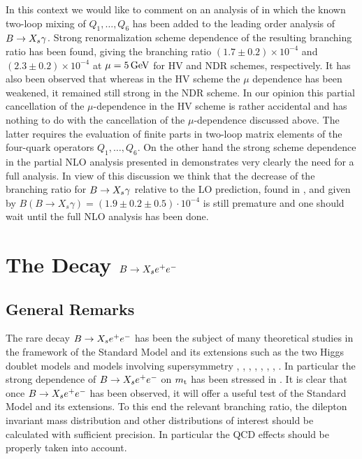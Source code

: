 In this context we would like to comment on an analysis of
\cite{Ciu:94} in which the known two-loop mixing of $Q_1,\ldots,Q_6$
has been added to the leading order analysis of $B \to X_s \gamma$.  Strong
renormalization scheme dependence of the resulting branching ratio has
been found, giving the branching ratio $(1.7 \pm 0.2)\times 10^{-4}$
and $(2.3 \pm 0.2)\times 10^{-4}$ at $\mu=5\, {\rm GeV}$ for HV and NDR
schemes, respectively. It has also been observed that whereas in the HV
scheme the $\mu$ dependence has been weakened, it remained still strong
in the NDR scheme. In our opinion this partial cancellation of the
$\mu$-dependence in the HV scheme is rather accidental and has nothing
to do with the cancellation of the $\mu$-dependence discussed above. The
latter requires the evaluation of finite parts in two-loop matrix
elements of the four-quark operators $Q_1,\ldots,Q_6$.  On the other
hand the strong scheme dependence in the partial NLO analysis presented
in \cite{Ciu:94} demonstrates very clearly the need for a full
analysis.  In view of this discussion we think that the decrease of the
branching ratio for $B \to X_s \gamma$ relative to the LO prediction, found in
\cite{Ciu:94}, and given by $B(B \to X_s \gamma) = (1.9 \pm 0.2 \pm
0.5) \cdot 10^{-4}$ is still premature and one should wait until the
full NLO analysis has been done.

\section{The Decay $B\to X_{\lowercase{s}} \lowercase{e}^+\lowercase{e}^-$}
         \label{sec:Heff:BXsee:nlo}
\subsection{General Remarks} 
         \label{sec:Heff:BXsee:nlo:rem}
The rare decay $B \to X_s e^+ e^-$ has been the subject of many theoretical studies
in the framework of the Standard Model and its extensions such as the
two Higgs doublet models and models involving supersymmetry
\cite{HWS:87}, \cite{grinstein:89a}, \cite{JW:90}, \cite{BBMR:91},
\cite{AMM:91}, \cite{DPT:93}, \cite{AGM:94}, \cite{GIW:94}.  In
particular the strong dependence of $B \to X_s e^+ e^-$ on $m_{\rm t}$ has been stressed
in \cite{HWS:87}. It is clear that once $B \to X_s e^+ e^-$ has been observed, it
will offer a useful test of the Standard Model and its extensions.
To this end the relevant branching ratio, the dilepton invariant mass
distribution and other distributions of interest should be calculated
with sufficient precision. In particular the QCD effects should be
properly taken into account.

